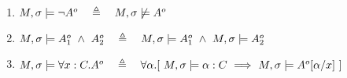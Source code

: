 \begin{definition}
\begin{enumerate}
\begin{enumerate}
\item
 $\satisfiesA{M}{\sigma}{\extThis}\ \ \Longrightarrow\ \ \forall x\!\in\! \sigma.\ \satisfiesA{M}{\sigma}{x\neq \alpha}$,
 \item
$\forall \alpha'.\forall f.[\ \alpha' \in {\LRelevantO {\sigma}} \wedge\   \satisfiesA{M}{\sigma}{\external {\alpha'}} 
\ \ \Longrightarrow \ \  
  \interpret {\sigma} {\alpha'.f} \neq \alpha     \ ]$ 
  \end{enumerate} 
$  \strut \hspace{4cm} ] $.

  \item
$\satisfiesA{M}{\sigma}{\neg \no A}\ \ \ \triangleq \ \ \   {M},{\sigma}\not\models{\no A}$
\item
$\satisfiesA{M}{\sigma}{\no A_1\ \wedge\ \no A_2}\ \ \ \triangleq \ \ \   \satisfiesA{M}{\sigma}{\no A_1} \   \wedge \ \satisfiesA{M}{\sigma}{\no A_2}$
\item
\label{quant1}
$\satisfiesA{M}{\sigma}{\all{x:C}{\no A}} \ \ \ \triangleq \ \ \   
\forall \alpha.[\   \satisfiesA {M}{\sigma} {\alpha:C}  \ \Longrightarrow   \ \satisfiesA{M}{\sigma} {\no A[\alpha/x]} \ ] $
\end{enumerate}

 \end{definition} 
% 
%
% 
